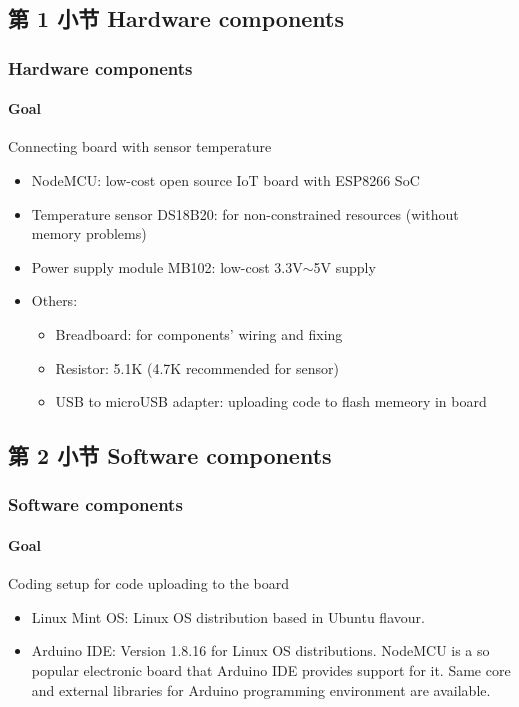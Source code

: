 \documentclass[
    aspectratio=169,                   %
]{beamer}
\begin{document}
\subsection{第 1 小节 Hardware components}

    \begin{frame}
        \frametitle{Hardware components}

        \paragraph{Goal} Connecting board with sensor temperature 

        \begin{itemize}
            \item \alert{NodeMCU\cite{nodemcu}}: low-cost open source IoT board with ESP8266 SoC
            \item \alert{Temperature sensor DS18B20\cite{ds18b20}}: for non-constrained resources (without memory problems)
            \item \alert{Power supply module MB102}: low-cost 3.3V$\sim$5V supply
            \item \alert{Others:}
            \begin{itemize}
                \item \alert{Breadboard}: for components' wiring and fixing
                \item \alert{Resistor}: 5.1K (4.7K recommended for sensor)
                \item \alert{USB to microUSB adapter}: uploading code to flash memeory in board      
            \end{itemize}
        \end{itemize}

    \end{frame}

\subsection{第 2 小节 Software components}

    \begin{frame}
        \frametitle{Software components}

        \paragraph{Goal} Coding setup for code uploading to the board

        \begin{itemize}
            \item \alert{Linux Mint OS}: Linux OS distribution based in Ubuntu flavour.
            \item \alert{Arduino IDE\cite{arduinoide}}: Version 1.8.16 for Linux OS distributions. NodeMCU is a so popular electronic board that Arduino IDE provides support for it. Same core and external libraries for Arduino programming environment are available.
        \end{itemize}

    \end{frame}
\end{document}
